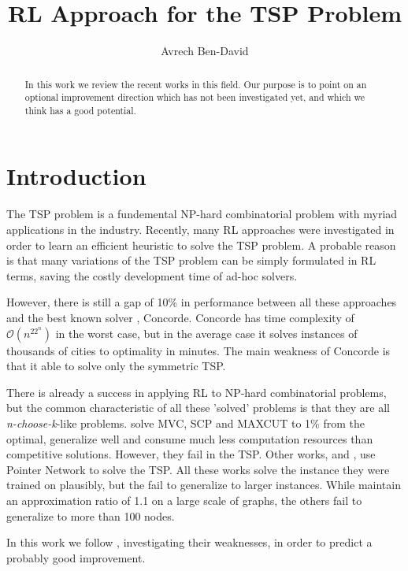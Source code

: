 \documentclass[10pt,a4paper,draft]{article}
\begin{document}
\title{RL Approach for the TSP Problem}
\author{Avrech Ben-David}
\maketitle
\begin{abstract}
In this work we review the recent works in this field. Our purpose is to point on an optional improvement direction which has not been investigated yet, and which we think has a good potential. 
\end{abstract}
\section{Introduction}
The TSP problem is a fundemental NP-hard combinatorial problem with myriad applications in the industry. Recently, many RL approaches were investigated in order to learn an efficient heuristic to solve the TSP problem. A probable reason is that many variations of the TSP problem can be simply formulated in RL terms, saving the costly development time of ad-hoc solvers. 

However, there is still a gap of 10\% in performance between all these approaches and the best known solver \cite{concorde}, Concorde. Concorde has time complexity of $\mathcal{O}(n^22^n)$ in the worst case, but in the average case it solves instances of thousands of cities to optimality in minutes. The main weakness of Concorde is that it able to solve only the symmetric TSP. 

There is already a success in applying RL to NP-hard combinatorial problems, but the common characteristic of all these 'solved' problems is that they are all \textit{n-choose-k}-like problems. \cite{dai17-tsp-s2v} solve MVC, SCP and MAXCUT to 1\% from the optimal, generalize well and consume much less computation resources than competitive solutions. However, they fail in the TSP. Other works, \cite{bello16-tsp-pnac} and \cite{deudon18-tsp-nr2opt}, use Pointer Network to solve the TSP. All these works solve the instance they were trained on plausibly, but the fail to generalize to larger instances. While \cite{dai17-tsp-s2v} maintain an approximation ratio of 1.1 on a large scale of graphs, the others fail to generalize to more than 100 nodes. 

In this work we follow \cite{dai17-tsp-s2v}, investigating their weaknesses, in order to predict a probably good improvement.
\end{document}
